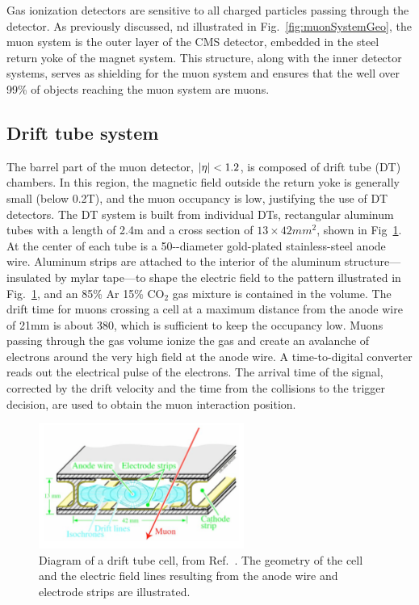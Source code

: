 Gas ionization detectors are
sensitive to all charged particles passing through the detector. As previously discussed,
nd illustrated in Fig.~\ref{fig:muonSystemGeo}, the muon system is 
the outer layer of the CMS detector, embedded in
the steel return yoke of the magnet system. This structure, along with the inner
detector systems, serves as shielding for the muon system and ensures that the 
well over 99\% of objects reaching the muon system are muons.

\subsection{Drift tube system}

The barrel part of the muon detector, $\lvert \eta \rvert < 1.2$,
is composed of drift tube (DT) chambers. In this region, the magnetic field
outside the return yoke is generally small (below 0.2\unit{T}), and the muon occupancy is low, justifying
the use of DT detectors. The DT system is built from individual DTs, 
rectangular aluminum tubes with a length of 2.4\unit{m} and a cross section
of $13\times42\unit{mm}^2$, shown in Fig~\ref{fig:DTs}. At the center of each
tube is a 50-\micron-diameter gold-plated stainless-steel anode wire.
Aluminum strips are attached to the interior of the aluminum 
structure---insulated by mylar tape---to
shape the electric field to the pattern illustrated in Fig.~\ref{fig:DTs},
and an 85\% Ar 15\% CO$_2$ gas mixture is contained in the volume. 
The drift time for muons crossing a
cell at a maximum distance from the anode wire of 21\unit{mm}
is about 380\micron, which is sufficient to keep the occupancy low.
Muons passing through the gas volume ionize the gas and create an avalanche of
electrons around the very high field at the anode wire.
A time-to-digital converter reads out the electrical pulse of the electrons.
The arrival time of the signal, corrected by the drift velocity and the time
from the collisions to the trigger decision, are used to obtain the muon interaction
position. 

\begin{figure}[htbp]
  \centering
   \includegraphics[width=0.6\textwidth]{figures/LHCandCMS/DriftTubeCutaway.png}
  \caption{
    Diagram of a drift tube cell, from Ref.~\cite{Chatrchyan:2008aa}. The 
    geometry of the cell and the electric field lines resulting from the 
    anode wire and electrode strips are illustrated.
        }
 \label{fig:DTs}
\end{figure}



